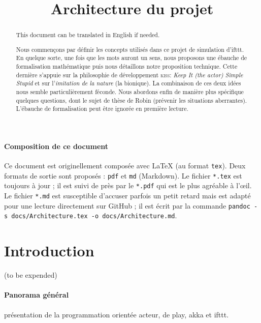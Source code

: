 \documentclass[11pt]{article}
\title{Architecture du projet}
\begin{document}
\maketitle
{}
\begin{abstract}
This document can be translated in English if needed.

Nous commençons par définir les concepts utilisés dans ce projet de simulation d'ifttt. En quelque sorte, une fois que les mots auront un sens, nous proposons une ébauche de formalisation mathématique puis nous détaillons notre proposition technique. Cette dernière s'appuie sur la philosophie de développement \textsc{kiss}: \textsl{Keep It (the actor) Simple Stupid} et sur l'\textsl{imitation de la nature} (la bionique). La combinaison de ces deux idées nous semble particulièrement féconde. Nous abordons enfin de manière plus spécifique quelques questions, dont le sujet de thèse de Robin (prévenir les situations aberrantes). L'ébauche de formalisation peut être ignorée en première lecture.
\end{abstract}
\cleardoublepage

\paragraph{Composition de ce document} Ce document est originellement composée avec \LaTeX{} (au format \texttt{tex}). Deux formats de sortie sont proposés : \texttt{pdf} et \texttt{md} (Markdown). Le fichier \texttt{*.tex} est toujours à jour ; il est suivi de près par le \texttt{*.pdf} qui est le plus agréable à l'œil. Le fichier \texttt{*.md} est susceptible d'accuser parfois un petit retard mais est adapté pour une lecture directement sur GitHub ; il est écrit par la commande \texttt{pandoc -s docs/Architecture.tex -o docs/Architecture.md}.

\tableofcontents

\section{Introduction}

(to be expended)

\paragraph{Panorama général} présentation de la programmation orientée acteur, de play, akka et ifttt.
\end{document}
